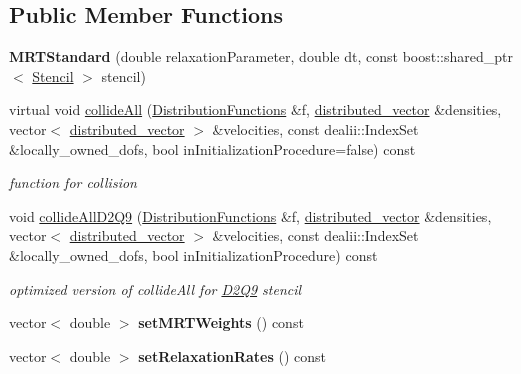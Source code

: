\subsection*{Public Member Functions}
\begin{DoxyCompactItemize}
\item 
\hypertarget{classnatrium_1_1MRTStandard_ab29f5d91681757338440a677f494e51e}{
{\bfseries MRTStandard} (double relaxationParameter, double dt, const boost::shared\_\-ptr$<$ \hyperlink{classnatrium_1_1Stencil}{Stencil} $>$ stencil)}
\label{classnatrium_1_1MRTStandard_ab29f5d91681757338440a677f494e51e}

\item 
virtual void \hyperlink{classnatrium_1_1MRTStandard_ae33b30f3080f8b933cf3b351092e8f09}{collideAll} (\hyperlink{classnatrium_1_1DistributionFunctions}{DistributionFunctions} \&f, \hyperlink{namespacenatrium_a903d2b92917f582f2ff05f52160ab811}{distributed\_\-vector} \&densities, vector$<$ \hyperlink{namespacenatrium_a903d2b92917f582f2ff05f52160ab811}{distributed\_\-vector} $>$ \&velocities, const dealii::IndexSet \&locally\_\-owned\_\-dofs, bool inInitializationProcedure=false) const 
\begin{DoxyCompactList}\small\item\em function for collision \item\end{DoxyCompactList}\item 
\hypertarget{classnatrium_1_1MRTStandard_aa1e422e0d86ff1754e9fb9e4df33a2ab}{
void \hyperlink{classnatrium_1_1MRTStandard_aa1e422e0d86ff1754e9fb9e4df33a2ab}{collideAllD2Q9} (\hyperlink{classnatrium_1_1DistributionFunctions}{DistributionFunctions} \&f, \hyperlink{namespacenatrium_a903d2b92917f582f2ff05f52160ab811}{distributed\_\-vector} \&densities, vector$<$ \hyperlink{namespacenatrium_a903d2b92917f582f2ff05f52160ab811}{distributed\_\-vector} $>$ \&velocities, const dealii::IndexSet \&locally\_\-owned\_\-dofs, bool inInitializationProcedure) const }
\label{classnatrium_1_1MRTStandard_aa1e422e0d86ff1754e9fb9e4df33a2ab}

\begin{DoxyCompactList}\small\item\em optimized version of collideAll for \hyperlink{classnatrium_1_1D2Q9}{D2Q9} stencil \item\end{DoxyCompactList}\item 
\hypertarget{classnatrium_1_1MRTStandard_aea329178a23726a72116465ccc692108}{
vector$<$ double $>$ {\bfseries setMRTWeights} () const }
\label{classnatrium_1_1MRTStandard_aea329178a23726a72116465ccc692108}

\item 
\hypertarget{classnatrium_1_1MRTStandard_a41ba2b4d689d15f1f0e018bd90a8f966}{
vector$<$ double $>$ {\bfseries setRelaxationRates} () const }
\label{classnatrium_1_1MRTStandard_a41ba2b4d689d15f1f0e018bd90a8f966}

\end{DoxyCompactItemize}
